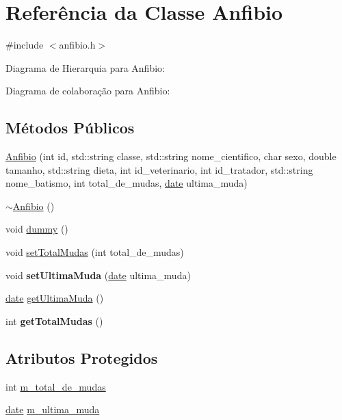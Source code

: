 \hypertarget{classAnfibio}{}\section{Referência da Classe Anfibio}
\label{classAnfibio}


{\ttfamily \#include $<$anfibio.\+h$>$}



Diagrama de Hierarquia para Anfibio\+:


Diagrama de colaboração para Anfibio\+:
\subsection*{Métodos Públicos}
\begin{DoxyCompactItemize}
\item 
\hyperlink{classAnfibio_abe236bbadbcf7d23944f1586aa9ad315}{Anfibio} (int id, std\+::string classe, std\+::string nome\+\_\+cientifico, char sexo, double tamanho, std\+::string dieta, int id\+\_\+veterinario, int id\+\_\+tratador, std\+::string nome\+\_\+batismo, int total\+\_\+de\+\_\+mudas, \hyperlink{classdate}{date} ultima\+\_\+muda)
\item 
\hyperlink{classAnfibio_a53bb71a1ed0e79c5fc41a62a0af9060c}{$\sim$\+Anfibio} ()
\item 
void \hyperlink{classAnfibio_a5f92eac4e6add9b2798119cc38dda093}{dummy} ()
\item 
void \hyperlink{classAnfibio_a61a9e310e2447380940413bc3ff53c19}{set\+Total\+Mudas} (int total\+\_\+de\+\_\+mudas)
\item 
\mbox{\label{classAnfibio_a7293bd62eeb5b8f9fd32fe4b2f9146ef}} 
void {\bfseries set\+Ultima\+Muda} (\hyperlink{classdate}{date} ultima\+\_\+muda)
\item 
\hyperlink{classdate}{date} \hyperlink{classAnfibio_a762169971fc7ad9065d944266c2507b3}{get\+Ultima\+Muda} ()
\item 
\mbox{\label{classAnfibio_a09eb168ca6f0d3ccc6ee261267546aed}} 
int {\bfseries get\+Total\+Mudas} ()
\end{DoxyCompactItemize}
\subsection*{Atributos Protegidos}
\begin{DoxyCompactItemize}
\item 
int \hyperlink{classAnfibio_a994200134b0d314e3db0ac5c781bb7e7}{m\+\_\+total\+\_\+de\+\_\+mudas}
\item 
\hyperlink{classdate}{date} \hyperlink{classAnfibio_a0cbc6ed64dc2cf979407b45053c838e9}{m\+\_\+ultima\+\_\+muda}
\end{DoxyCompactItemize}

